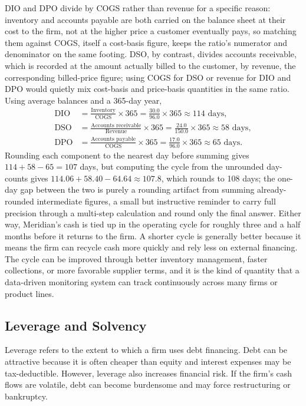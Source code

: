 \documentclass[../ai_in_finance]{subfiles}
\begin{document}
DIO and DPO divide by COGS rather than revenue for a specific reason: inventory and accounts payable are both carried on the balance sheet at their cost to the firm, not at the higher price a customer eventually pays, so matching them against COGS, itself a cost-basis figure, keeps the ratio's numerator and denominator on the same footing.
DSO, by contrast, divides accounts receivable, which is recorded at the amount actually billed to the customer, by revenue, the corresponding billed-price figure; using COGS for DSO or revenue for DIO and DPO would quietly mix cost-basis and price-basis quantities in the same ratio. Using average balances and a 365-day year,
\begin{align*}
\text{DIO} &= \frac{\text{Inventory}}{\text{COGS}} \times 365 = \frac{30.0}{96.0}\times 365 \approx 114 \text{ days}, \\
\text{DSO} &= \frac{\text{Accounts receivable}}{\text{Revenue}} \times 365 = \frac{24.0}{150.0}\times 365 \approx 58 \text{ days}, \\
\text{DPO} &= \frac{\text{Accounts payable}}{\text{COGS}} \times 365 = \frac{17.0}{96.0}\times 365 \approx 65 \text{ days}.
\end{align*}
Rounding each component to the nearest day before summing gives $114 + 58 - 65 = 107$ days, but computing the cycle from the unrounded day-counts gives $114.06 + 58.40 - 64.64 \approx 107.8$, which rounds to 108 days; the one-day gap between the two is purely a rounding artifact from summing already-rounded intermediate figures, a small but instructive reminder to carry full precision through a multi-step calculation and round only the final answer. Either way, Meridian's cash is tied up in the operating cycle for roughly three and a half months before it returns to the firm. A shorter cycle is generally better because it means the firm can recycle cash more quickly and rely less on external financing. The cycle can be improved through better inventory management, faster collections, or more favorable supplier terms, and it is the kind of quantity that a data-driven monitoring system can track continuously across many firms or product lines.

\subsection{Leverage and Solvency}

Leverage refers to the extent to which a firm uses debt financing. Debt can be attractive because it is often cheaper than equity and interest expenses may be tax-deductible. However, leverage also increases financial risk. If the firm's cash flows are volatile, debt can become burdensome and may force restructuring or bankruptcy.
\end{document}

